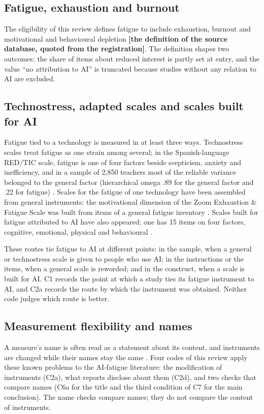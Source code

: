 \documentclass[11pt]{article}
\newcommand{\tbd}[1]{\textbf{[#1]}}
\begin{document}
\subsection{Fatigue, exhaustion and burnout}
The eligibility of this review defines fatigue to include exhaustion, burnout and motivational and behavioural
depletion \tbd{the definition of the source database, quoted from the registration}. The definition shapes two
outcomes: the share of items about reduced interest is partly set at entry, and the value ``no attribution to AI'' is
truncated because studies without any relation to AI are excluded.

\subsection{Technostress, adapted scales and scales built for AI}
Fatigue tied to a technology is measured in at least three ways. Technostress scales treat fatigue as one strain
among several; in the Spanish-language RED/TIC scale, fatigue is one of four factors beside scepticism, anxiety and
inefficiency, and in a sample of 2,850 teachers most of the reliable variance belonged to the general factor
(hierarchical omega .89 for the general factor and .22 for fatigue) \citep{ortega2023}. Scales for the fatigue of one
technology have been assembled from general instruments: the motivational dimension of the Zoom Exhaustion \&
Fatigue Scale was built from items of a general fatigue inventory \citep{fauville2021}. Scales built for fatigue
attributed to AI have also appeared; one has 15 items on four factors, cognitive, emotional, physical and behavioural
\citep{lau2026}.

These routes tie fatigue to AI at different points: in the sample, when a general or technostress scale is given to
people who use AI; in the instructions or the items, when a general scale is reworded; and in the construct, when a
scale is built for AI. C1 records the point at which a study ties its fatigue instrument to AI, and C2a records the
route by which the instrument was obtained. Neither code judges which route is better.

\subsection{Measurement flexibility and names}
A measure's name is often read as a statement about its content, and instruments are changed while their names stay the
same \citep{elson2023}. Four codes of this review apply these known problems to the AI-fatigue literature: the
modification of instruments (C2a), what reports disclose about them (C2d), and two checks that compare names (C6a for
the title and the third condition of C7 for the main conclusion). The name checks compare names; they do not compare
the content of instruments.
\end{document}
